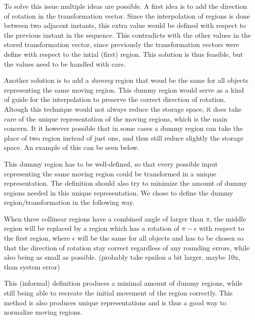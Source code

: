 	
	To solve this issue multiple ideas are possible. A first idea is to add the direction of rotation in the transformation vector. Since the interpolation of regions is done between two adjacent instants, this extra value would be defined with respect to the previous instant in the sequence. This contradicts with the other values in the stored transformation vector, since previously the transformation vectors were define with respect to the intial (first) region. This solution is thus feasible, but the values need to be handled with care.
	
	Another solution is to add a \textit{dummy} region that woud be the same for all objects representing the same moving region. This dummy region would serve as a kind of guide for the interpolation to preserve the correct direction of rotation. Altough this technique would not always reduce the storage space, it does take care of the unique representation of the moving regions, which is the main concern. It it however possible that in some cases a dummy region can take the place of two region instead of just one, and thus still reduce slightly the storage space. An example of this can be seen below.
	
	
	This dummy region has to be well-defined, so that every possible input representing the same moving region could be transformed in a unique representation. The definition should also try to minimize the amount of dummy regions needed in this unique representation. We chose to define the dummy region/transformation  in the following way.
	
	When three collinear regions have a combined angle of larger than $\pi$, the middle region will be replaced by a region which has a rotation of $\pi - \epsilon$ with respect to the first region, where $\epsilon$ will be the same for all objects and has to be chosen so that the direction of rotation stay correct regardless of any rounding errors, while also being as small as possible. (probably take epsilon a bit larger, maybe 10x, than system error)
	
	This (informal) definition produces a minimal amount of dummy regions, while still being able to recreate the initial movement of the region correctly. This method is also produces unique representations and is thus a good way to normalize moving regions.
	
